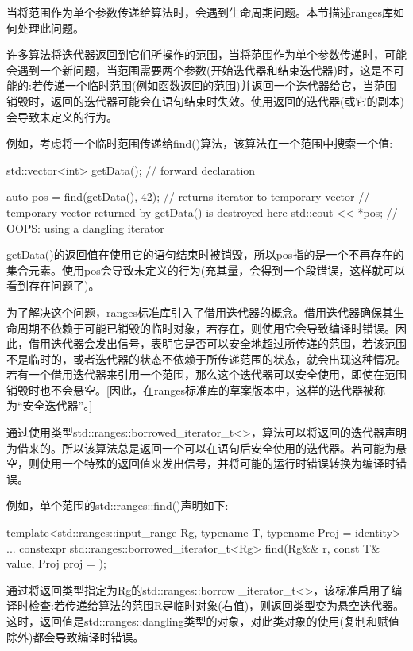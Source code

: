 

当将范围作为单个参数传递给算法时，会遇到生命周期问题。本节描述ranges库如何处理此问题。


许多算法将迭代器返回到它们所操作的范围，当将范围作为单个参数传递时，可能会遇到一个新问题，当范围需要两个参数(开始迭代器和结束迭代器)时，这是不可能的:若传递一个临时范围(例如函数返回的范围)并返回一个迭代器给它，当范围销毁时，返回的迭代器可能会在语句结束时失效。使用返回的迭代器(或它的副本)会导致未定义的行为。

例如，考虑将一个临时范围传递给find()算法，该算法在一个范围中搜索一个值:

\begin{cpp}
std::vector<int> getData(); // forward declaration

auto pos = find(getData(), 42); // returns iterator to temporary vector
// temporary vector returned by getData() is destroyed here
std::cout << *pos; // OOPS: using a dangling iterator
\end{cpp}

getData()的返回值在使用它的语句结束时被销毁，所以pos指的是一个不再存在的集合元素。使用pos会导致未定义的行为(充其量，会得到一个段错误，这样就可以看到存在问题了)。

为了解决这个问题，ranges标准库引入了借用迭代器的概念。借用迭代器确保其生命周期不依赖于可能已销毁的临时对象，若存在，则使用它会导致编译时错误。因此，借用迭代器会发出信号，表明它是否可以安全地超过所传递的范围，若该范围不是临时的，或者迭代器的状态不依赖于所传递范围的状态，就会出现这种情况。若有一个借用迭代器来引用一个范围，那么这个迭代器可以安全使用，即使在范围销毁时也不会悬空。[因此，在ranges标准库的草案版本中，这样的迭代器被称为“安全迭代器”。]

通过使用类型std::ranges::borrowed\_iterator\_t<>，算法可以将返回的迭代器声明为借来的。所以该算法总是返回一个可以在语句后安全使用的迭代器。若可能为悬空，则使用一个特殊的返回值来发出信号，并将可能的运行时错误转换为编译时错误。

例如，单个范围的std::ranges::find()声明如下:

\begin{cpp}
template<std::ranges::input_range Rg,
			typename T,
			typename Proj = identity>
...
constexpr std::ranges::borrowed_iterator_t<Rg>
	find(Rg&& r, const T& value, Proj proj = {});
\end{cpp}

通过将返回类型指定为Rg的std::ranges::borrow \_iterator\_t<>，该标准启用了编译时检查:若传递给算法的范围R是临时对象(右值)，则返回类型变为悬空迭代器。这时，返回值是std::ranges::dangling类型的对象，对此类对象的使用(复制和赋值除外)都会导致编译时错误。

